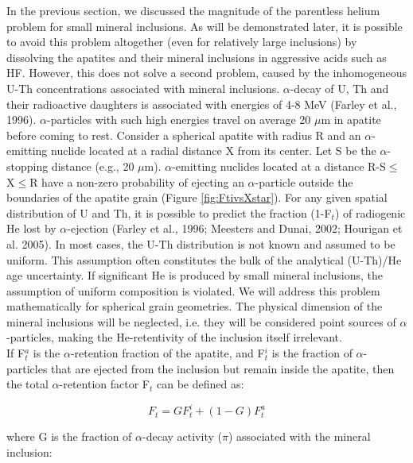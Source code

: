 \documentclass{article}
\begin{document}
In the previous section, we  discussed the magnitude of the parentless
helium problem for small  mineral inclusions.  As will be demonstrated
later,  it is  possible to  avoid  this problem  altogether (even  for
relatively  large inclusions)  by  dissolving the  apatites and  their
mineral inclusions in aggressive acids such as HF.  However, this does
not  solve  a  second   problem,  caused  by  the  inhomogeneous  U-Th
concentrations associated with  mineral inclusions.  $\alpha$-decay of
U, Th and  their radioactive daughters is associated  with energies of
4-8  MeV (Farley  et al.,  1996).  $\alpha$-particles  with  such high
energies travel on average 20 $\mu$m in apatite before coming to rest.
Consider a  spherical apatite with  radius R and  an $\alpha$-emitting
nuclide located at a radial distance  X from its center.  Let S be the
$\alpha$-stopping  distance   (e.g.,  20  $\mu$m).   $\alpha$-emitting
nuclides  located  at a  distance  R-S$\leq$X$\leq$R  have a  non-zero
probability of ejecting an $\alpha$-particle outside the boundaries of
the  apatite  grain  (Figure  \ref{fig:FtivsXstar}).   For  any  given
spatial  distribution of  U  and Th,  it  is possible  to predict  the
fraction (1-F$_t$) of radiogenic  He lost by $\alpha$-ejection (Farley
et al.,  1996; Meesters and Dunai,  2002; Hourigan et  al.  2005).  In
most  cases, the  U-Th distribution  is not  known and  assumed  to be
uniform.  This assumption often constitutes the bulk of the analytical
(U-Th)/He  age uncertainty.  If  significant He  is produced  by small
mineral inclusions, the assumption of uniform composition is violated.
We  will  address  this  problem mathematically  for  spherical  grain
geometries.  The physical dimension  of the mineral inclusions will be
neglected,   i.e.   they   will   be  considered   point  sources   of
$\alpha$-particles, making the  He-retentivity of the inclusion itself
irrelevant.
\\

If  F$_t^a$ is  the $\alpha$-retention  fraction of  the  apatite, and
F$_t^i$ is  the fraction of  $\alpha$-particles that are  ejected from
the  inclusion   but  remain  inside  the  apatite,   then  the  total
$\alpha$-retention factor F$_t$ can be defined as:

\begin{equation}
  \label{eq:Ft}
  F_t = G F_t^i + (1-G) F_t^a
\end{equation}

where G  is the fraction of $\alpha$-decay activity ($\pi$) associated
with the mineral inclusion:
\end{document}
